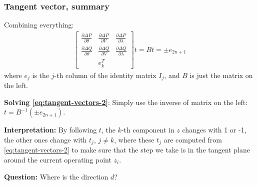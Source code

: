 \documentclass{beamer}
\begin{document}
\begin{frame}
  \frametitle{Tangent vector, summary}
Combining everything:
\begin{align}
  \label{eq:tangent-vectors-2}
  \begin{bmatrix}
  \frac{\partial \Delta P}{\partial \theta} & \frac{\partial \Delta P}{\partial V} & \frac{\partial \Delta P}{\partial \lambda} \\
  \frac{\partial \Delta Q}{\partial \theta} & \frac{\partial \Delta Q}{\partial V} & \frac{\partial \Delta Q}{\partial \lambda} \\
   & e_k^T & 
  \end{bmatrix} t = Bt = \pm e_{2n+1}
\end{align}
where $e_j$ is the $j$-th column of the identity matrix $I_{j}$, and $B$ is just the matrix on the left.

\textbf{Solving \eqref{eq:tangent-vectors-2}}: Simply use the inverse of matrix on the left: $t = B^{-1} (\pm e_{2n+1})$.

\textbf{Interpretation:} By following $t$, the $k$-th component in $z$ changes with 1 or -1, the other ones change with $t_j$, $j \neq k$, where these $t_j$ are computed from \eqref{eq:tangent-vectors-2} to make sure that the step we take is in the tangent plane around the current operating point $z_i$.

\textbf{Question:} Where is the direction $d$?  
\end{frame}
\end{document}
